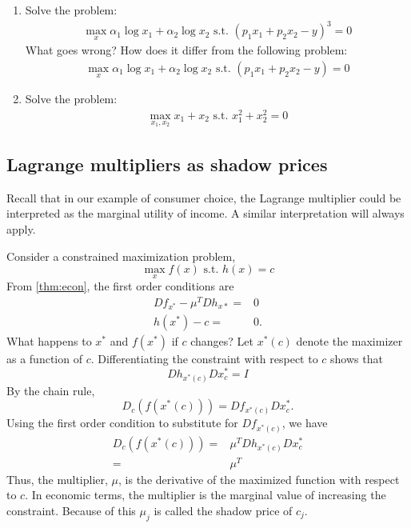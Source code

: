 \begin{exercise}
  \begin{enumerate}
  \item Solve the problem:
    \begin{align*}
    \max_{x} \alpha_1 \log x_1 + \alpha_2 \log x_2 \text{ s.t. } (p_1
      x_1 + p_2 x_2 - y)^3 = 0
    \end{align*}
    What goes wrong? How does it differ from the following problem:
    \begin{align*}
      \max_{x} \alpha_1 \log x_1 + \alpha_2 \log x_2 \text{ s.t. } (p_1
      x_1 + p_2 x_2 - y) = 0
    \end{align*}  
  \item Solve the problem:
    \begin{align*}
      \max_{x_1,x_2} x_1 + x_2 \text{ s.t. } x_1^2 + x_2^2 = 0
    \end{align*}
  \end{enumerate}
\end{exercise}

\subsection{Lagrange multipliers as shadow prices}

Recall that in our example of consumer choice, the Lagrange multiplier
could be interpreted as the marginal utility of income.  A similar
interpretation will always apply. 

Consider a constrained maximization problem,
\[ \max_{x} f(x) \text{ s.t. } h(x) = c \]
From \ref{thm:econ}, the first order conditions are
\begin{align*}
 Df_{x^*} - \mu^T Dh_{x*} = & 0 \\
 h(x^*) - c = & 0.
\end{align*}
What happens to $x^*$ and $f(x^*)$ if $c$ changes? Let $x^*(c)$ denote
the maximizer as a function of $c$. Differentiating the constraint
with respect to $c$ shows that
\[ Dh_{x^*(c)} Dx^*_c = I \]
By the chain rule,
\[ D_c \left( f(x^*(c)) \right) = Df_{x^*(c)} Dx^*_c. \] 
Using the first order condition to substitute for $Df_{x^*(c)}$, we
have
\begin{align*}
  D_c \left( f(x^*(c)) \right) = & \mu^T Dh_{x^*(c)} Dx^*_c \\
  = & \mu^T 
\end{align*}
Thus, the multiplier, $\mu$, is the derivative of the maximized
function with respect to $c$.  In economic terms, the multiplier is
the marginal value of increasing the constraint. Because of this
$\mu_j$ is called the shadow price of $c_j$. 


